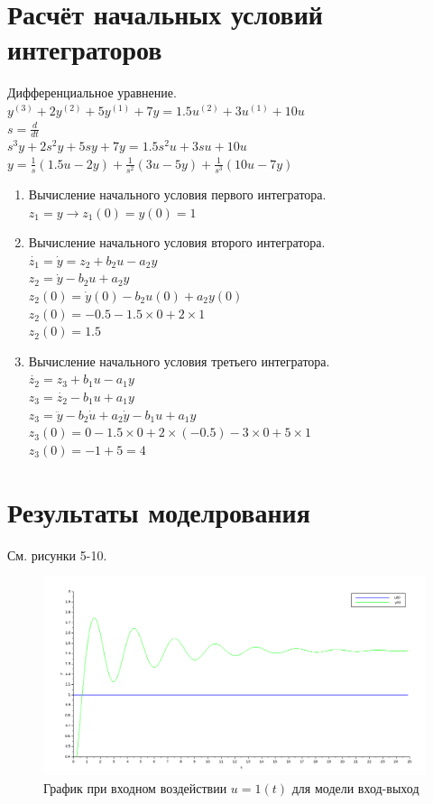 \documentclass[12pt, a4paper] {ncc}
\begin{document}
\section{Расчёт начальных условий интеграторов}

		Дифференциальное уравнение.\\
		$y^{(3)} + 2 y^{(2)} + 5 y^{(1)} + 7 y = 1.5 u^{(2)} + 3 u^{(1)} + 10 u $ \\
		$s = \frac{d} {d t}$ \\
		$s^3y + 2 s^2 y  + 5 s y + 7 y = 1.5 s^2 u + 3s u + 10 u$\\
		$y = \frac{1}{s} (1.5 u - 2 y ) + \frac{1}{s^2} (3 u - 5 y) + \frac{1}{s^3}(10 u - 7 y)$
		\begin{enumerate}
			\item Вычисление начального условия первого интегратора. \\
				  $z_1 = y \to z_1(0) = y(0) = 1 $
			\item Вычисление начального условия второго интегратора. \\
				  $\dot{z_1} = \dot{y} = z_2 + b_2 u - a_2 y$ \\
				  $z_2 = \dot{y} - b_2  u + a_2 y $ \\
				  $z_2(0) = \dot{y}(0) - b_2  u(0) + a_2 y(0) $ \\
				  $z_2(0) = -0.5 - 1.5 \times 0 + 2 \times 1$ \\
				  $z_2(0) = 1.5$
			\item Вычисление начального условия третьего интегратора. \\
				  $\dot{z_2} = z_3 + b_1 u - a_1 y $ \\
				  $z_3 = \dot{z_2} - b_1 u + a_1 y $ \\
				  $z_3 = \ddot{y} - b_2 \dot{u} + a_2 \dot{y} - b_1 u + a_1 y$ \\
				  $z_3(0) = 0 - 1.5 \times 0 + 2 \times (-0.5) - 3 \times 0 + 5 \times 1$ \\
				  $z_3(0) = -1 + 5 = 4$
		\end{enumerate}

	\section{Результаты моделрования}
		См. рисунки 5-10.

		\begin{figure}[ht!]
    		\includegraphics[scale=0.4]{./plotio1t1.png}
			\caption{График при входном воздействии $u = 1(t)$ для модели вход-выход}
		\end{figure}
\end{document}
